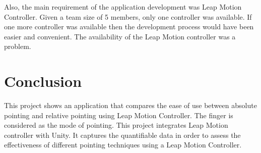 \documentclass[titlepage]{article}
\begin{document}
Also, the main requirement of the application development was Leap Motion Controller. Given a team size of 5 members, only one controller was available. If one more controller was available then the development process would have been easier and convenient. The availability of the Leap Motion controller was a problem. 


\section{Conclusion}
This project shows an application that compares the ease of use between absolute pointing and relative pointing using Leap Motion Controller. The finger is considered as the mode of pointing. This project integrates Leap Motion controller with Unity. It captures the quantifiable data in order to assess the effectiveness of different pointing techniques using a Leap Motion Controller. 







\end{document}
